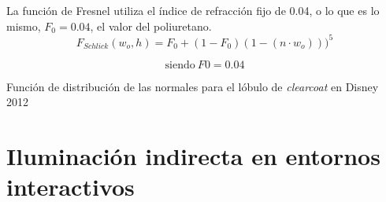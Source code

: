                 La funci\'on de Fresnel utiliza el \'indice de refracci\'on fijo de 0.04, o lo que es lo mismo, $F_0 = 0.04$, el valor
                del poliuretano.\\

                $$
                F_{Schlick}(w_o, h) = F_0 + (1 - F_0) (1 - (n\cdot{w_o})))^5
                $$
                \begin{eqfloat}[!htb]
                    \begin{equation}
                        \textrm{siendo}\ F0 = 0.04
                    \end{equation}
                    \caption{Funci\'on de distribuci\'on de las normales para el l\'obulo de \textit{clearcoat} en Disney 2012}
                \end{eqfloat}
                \singlespacing



    
    \section{Iluminaci\'on indirecta en entornos interactivos}

        
    

